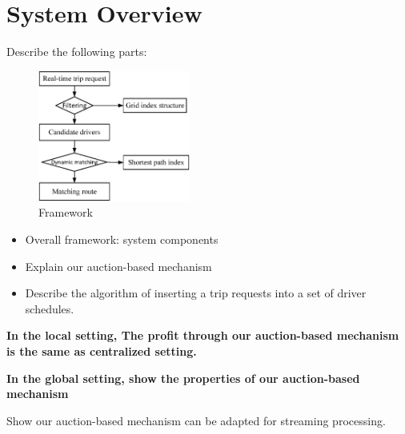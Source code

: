 \section{System Overview}
Describe the following parts:

\begin{figure}[!ht]
	\centering
	\includegraphics[width = 50mm]{fig/framework.eps}
	\vspace{-0mm}\caption{Framework} \vspace{-2mm} 
\end{figure}\vspace{-0mm}

\begin{itemize}
	\item Overall framework: system components
	\item Explain our auction-based mechanism
	\item Describe the algorithm of inserting a trip requests into a set of driver schedules.
\end{itemize}

\begin{lemma}
	\textbf{In the local setting, The profit through our auction-based mechanism is the same as centralized setting.}
\end{lemma}

\begin{lemma}
	\textbf{In the global setting, show the properties of our auction-based mechanism}
\end{lemma}

Show our auction-based mechanism can be adapted for streaming processing.
